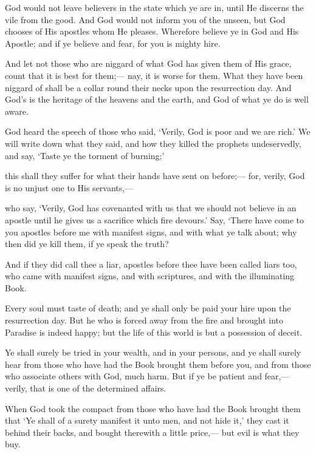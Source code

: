 \documentclass[fontsize=14pt, letterpaper, notitlepage, openany, DIV=12]{scrbook} %
\begin{document}
\noindent[3:179]
God would not leave believers in the state which ye are in, until He discerns the vile from
the good. And God would not inform you of the unseen, but God chooses of His apostles whom
He pleases. Wherefore believe ye in God and His Apostle; and if ye believe and fear, for you is
mighty hire.

\noindent[3:180]
And let not those who are niggard of what God has given them of His grace, count that it
is best for them;--- nay, it is worse for them. What they have been niggard of shall be a collar
round their necks upon the resurrection day. And God's is the heritage of the heavens and the
earth, and God of what ye do is well aware.

\noindent[3:181]
God heard the speech of those who said, `Verily, God is poor and we are rich.' We will
write down what they said, and how they killed the prophets undeservedly, and say, `Taste ye the
torment of burning;'

\noindent[3:182]
this shall they suffer for what their hands have sent on before;--- for, verily, God is no
unjust one to His servants,---

\noindent[3:183]
who say, `Verily, God has covenanted with us that we should not believe in an apostle
until he gives us a sacrifice which fire devours.' Say, `There have come to you apostles before
me with manifest signs, and with what ye talk about; why then did ye kill them, if ye speak the
truth?

\noindent[3:184]
And if they did call thee a liar, apostles before thee have been called liars too, who came
with manifest signs, and with scriptures, and with the illuminating Book.

\noindent[3:185]
Every soul must taste of death; and ye shall only be paid your hire upon the resurrection
day. But he who is forced away from the fire and brought into Paradise is indeed happy; but the
life of this world is but a possession of deceit.

\noindent[3:186]
Ye shall surely be tried in your wealth, and in your persons, and ye shall surely hear from
those who have had the Book brought them before you, and from those who associate others
with God, much harm. But if ye be patient and fear,--- verily, that is one of the determined
affairs.

\noindent[3:187]
When God took the compact from those who have had the Book brought them that `Ye
shall of a surety manifest it unto men, and not hide it,' they cast it behind their backs, and bought
therewith a little price,--- but evil is what they buy.
\end{document}
